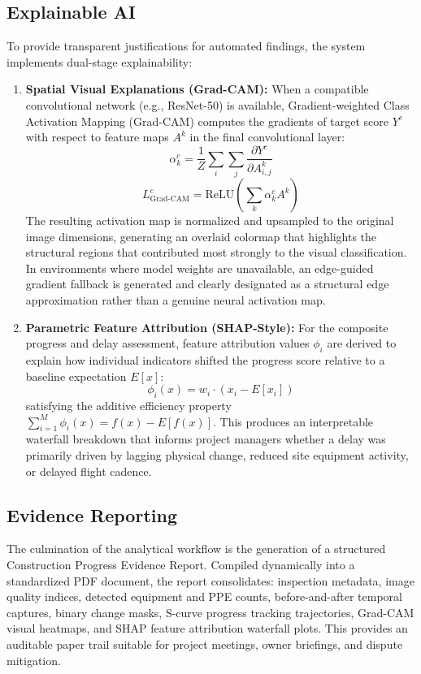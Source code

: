 \documentclass[conference]{IEEEtran}
\begin{document}
\subsection{Explainable AI}
To provide transparent justifications for automated findings, the system implements dual-stage explainability:
\begin{enumerate}
    \item \textbf{Spatial Visual Explanations (Grad-CAM):} When a compatible convolutional network (e.g., ResNet-50) is available, Gradient-weighted Class Activation Mapping (Grad-CAM) \cite{selvaraju2017grad} computes the gradients of target score $Y^c$ with respect to feature maps $A^k$ in the final convolutional layer:
    \begin{equation}
        \alpha_k^c = \frac{1}{Z} \sum_{i} \sum_{j} \frac{\partial Y^c}{\partial A_{i,j}^k}
        \label{eq:gradcam_weights}
    \end{equation}
    \begin{equation}
        L_{\text{Grad-CAM}}^c = \text{ReLU}\left( \sum_{k} \alpha_k^c A^k \right)
        \label{eq:gradcam_map}
    \end{equation}
    The resulting activation map is normalized and upsampled to the original image dimensions, generating an overlaid colormap that highlights the structural regions that contributed most strongly to the visual classification. In environments where model weights are unavailable, an edge-guided gradient fallback is generated and clearly designated as a structural edge approximation rather than a genuine neural activation map.
    \item \textbf{Parametric Feature Attribution (SHAP-Style):} For the composite progress and delay assessment, feature attribution values $\phi_i$ are derived to explain how individual indicators shifted the progress score relative to a baseline expectation $E[x]$:
    \begin{equation}
        \phi_i(x) = w_i \cdot \left( x_i - E[x_i] \right)
        \label{eq:shap_attribution}
    \end{equation}
    satisfying the additive efficiency property $\sum_{i=1}^M \phi_i(x) = f(x) - E[f(x)]$. This produces an interpretable waterfall breakdown that informs project managers whether a delay was primarily driven by lagging physical change, reduced site equipment activity, or delayed flight cadence.
\end{enumerate}

\subsection{Evidence Reporting}
The culmination of the analytical workflow is the generation of a structured Construction Progress Evidence Report. Compiled dynamically into a standardized PDF document, the report consolidates: inspection metadata, image quality indices, detected equipment and PPE counts, before-and-after temporal captures, binary change masks, S-curve progress tracking trajectories, Grad-CAM visual heatmaps, and SHAP feature attribution waterfall plots. This provides an auditable paper trail suitable for project meetings, owner briefings, and dispute mitigation.
\end{document}
